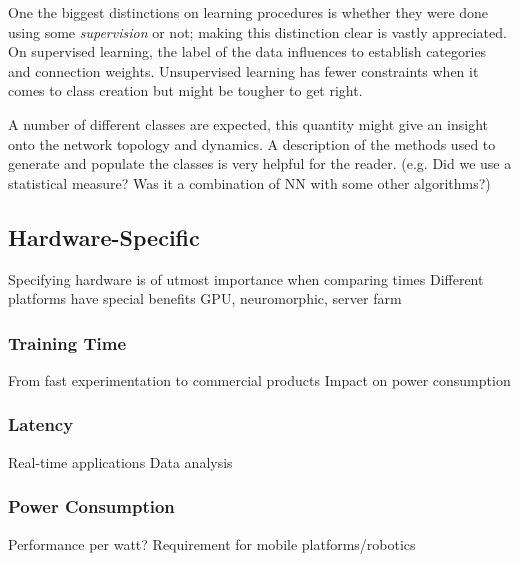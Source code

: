 One the biggest distinctions on learning procedures is whether they were done using some \emph{supervision} or not; making this distinction clear is vastly appreciated. On supervised learning, the label of the data influences to establish categories and connection weights. Unsupervised learning has fewer constraints when it comes to class creation but might be tougher to get right. 

A number of different classes are expected, this quantity might give an insight onto the network topology and dynamics. A description of the methods used to generate and populate the classes is very helpful for the reader. (e.g. Did we use a statistical measure? Was it a combination of NN with some other algorithms?)


\subsection{Hardware-Specific}
Specifying hardware is of utmost importance when comparing times
Different platforms have special benefits
GPU, neuromorphic, server farm

  \subsubsection{Training Time}
    From fast experimentation to commercial products
    Impact on power consumption
  \subsubsection{Latency}
    Real-time applications
    Data analysis
  \subsubsection{Power Consumption}
    Performance per watt?
    Requirement for mobile platforms/robotics
    
